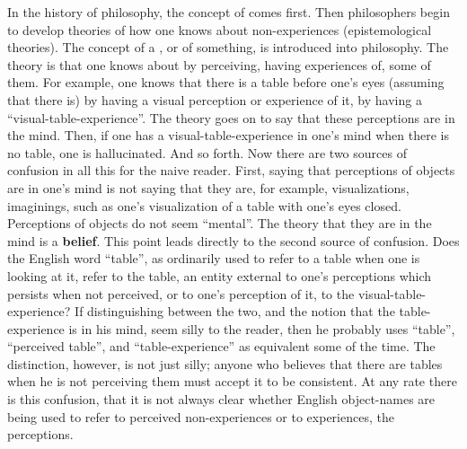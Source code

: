 In the history of philosophy, the concept of  comes first. Then philosophers begin to develop theories of how one knows about non-experiences (epistemological theories). The concept of a , or  of something, is introduced into philosophy. The theory is that one knows about  by perceiving, having experiences of, some of them. For example, one knows that there is a table before one's eyes (assuming that there is) by having a visual perception or experience of it, by having a \enquote{visual-table-experience}. The theory goes on to say that these perceptions are in the mind. Then, if one has a visual-table-experience in one's mind when there is no table, one is hallucinated. And so forth. Now there are two sources of confusion in all this for the naive reader. First, saying that perceptions of objects are in one's mind is not saying that they are, for example, visualizations, imaginings, such as one's visualization of a table with one's eyes closed. Perceptions of objects do not seem \enquote{mental}. The theory that they are in the mind is a \textbf{belief}. This point leads directly to the second source of confusion. Does the English word \enquote{table}, as ordinarily used to refer to a table when one is looking at it, refer to the table, an entity external to one's perceptions which persists when not perceived, or to one's perception of it, to the visual-table-experience? If distinguishing between the two, and the notion that the table-experience is in his mind, seem silly to the reader, then he probably uses \enquote{table}, \enquote{perceived table}, and \enquote{table-experience} as equivalent some of the time. The distinction, however, is not just silly; anyone who believes that there are tables when he is not perceiving them must accept it to be consistent. At any rate there is this confusion, that it is not always clear whether English object-names are being used to refer to perceived non-experiences or to experiences, the perceptions. 

